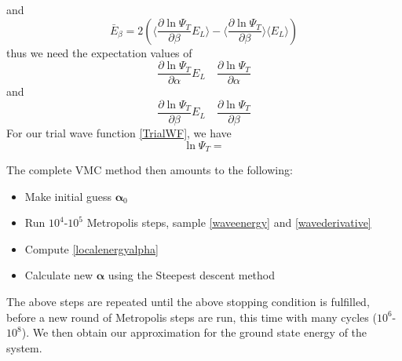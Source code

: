 \documentclass[english, a4paper]{article}
\begin{document}
and 
\begin{equation}
 \bar{E}_\beta = 2 \left( \Bigr\langle \frac{\partial \ln{\Psi_T}}{\partial \beta} E_L 
 \Bigr\rangle 
 - \Bigr\langle \frac{\partial \ln{\Psi_T}}{\partial \beta}\Bigr\rangle \langle E_L \rangle   \right)
 \label{localenergybeta}
\end{equation}
thus we need the expectation values of
\begin{equation}
 \frac{\partial \ln{\Psi_T}}{\partial \alpha} E_L \quad
  \frac{\partial \ln{\Psi_T}}{\partial \alpha}
\end{equation}
and 
\begin{equation}
 \frac{\partial \ln{\Psi_T}}{\partial \beta} E_L \quad
  \frac{\partial \ln{\Psi_T}}{\partial \beta}
\end{equation}
For our trial wave function \eqref{TrialWF}, we have
\begin{equation}
 \ln{\Psi_T} = 
\end{equation}

The complete VMC method then amounts to the following:
\begin{itemize}
 \item Make initial guess $\boldsymbol{\alpha}_0$
 \item Run $10^4$-$10^5$ Metropolis steps, sample \eqref{waveenergy} and \eqref{wavederivative}
 \item Compute \eqref{localenergyalpha} 
 \item Calculate new $\boldsymbol{\alpha}$ using the Steepest descent method
\end{itemize}
The above steps are repeated until the above stopping condition is fulfilled, before a new round of
Metropolis steps are run, this time with many cycles ($10^6$-$10^8$). We then obtain our approximation
for the ground state energy of the system.\\
\end{document}
